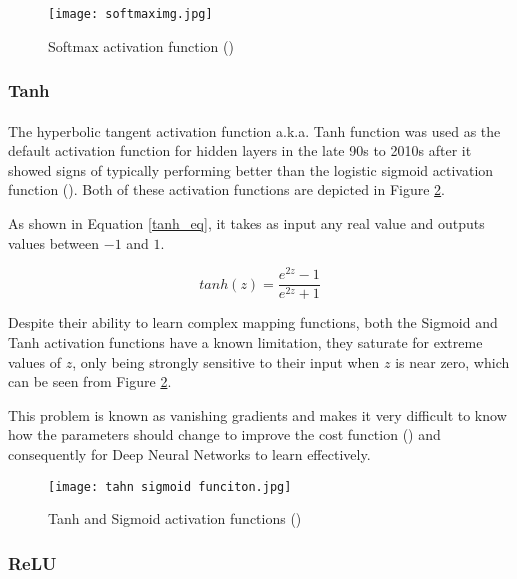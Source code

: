 \begin{figure}[hbt!]
    \centering
    \texttt{[image: softmaximg.jpg]}
    \caption{Softmax activation function (\cite{softmaxpic})}
    \label{fig_softmax}
\end{figure}

\subsubsection{Tanh}
\paragraph{}
The hyperbolic tangent activation function \gls{a.k.a.} Tanh function was used as the default activation function for hidden layers in the late 90s to 2010s after it showed signs of typically performing better than the logistic sigmoid activation function (\cite{GoodBengCour16}).
Both of these activation functions are depicted in Figure \ref{fig_tahn_sigmoid}.

As shown in Equation \ref{tanh_eq}, it takes as input any real value and outputs values between $-1$ and $1$.

\begin{equation}
    \label{tanh_eq}
    tanh(z) = \frac{e^{2z} - 1}{ e^{2z} + 1} 
\end{equation}

Despite their ability to learn complex mapping functions, both the Sigmoid and Tanh activation functions have a known limitation, they saturate for extreme values of $z$, only being strongly sensitive to their input when $z$ is near zero, which can be seen from Figure \ref{fig_tahn_sigmoid}. 

This problem is known as vanishing gradients and makes it very difficult to know how the parameters should change to improve the cost function (\cite{GoodBengCour16}) and consequently for Deep Neural Networks to learn effectively.

\begin{figure}[hbt!]
    \centering
    \texttt{[image: tahn sigmoid funciton.jpg]}
    \caption{Tanh and Sigmoid activation functions (\cite{tahnfunc})}
    \label{fig_tahn_sigmoid}

\end{figure}

\subsubsection{\gls{ReLU}}
